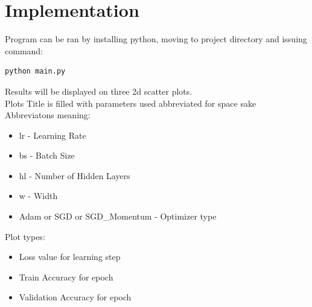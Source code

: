 \section{Implementation}
Program can be ran by installing python, moving to project directory and issuing command:
\begin{lstlisting}[language=bash]
python main.py
\end{lstlisting}
Results will be displayed on three 2d scatter plots. \\ 
Plots Title is filled with parameters used abbreviated for space sake \\ 
Abbreviatons meaning: 
\begin{itemize} 
    \item lr - Learning Rate
    \item bs - Batch Size 
    \item hl - Number of Hidden Layers 
    \item w - Width 
    \item Adam or SGD or SGD\_Momentum - Optimizer type
\end{itemize}
Plot types: 
\begin{itemize}
    \item Loss value for learning step
    \item Train Accuracy for epoch
    \item Validation Accuracy for epoch
\end{itemize}

